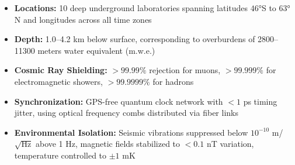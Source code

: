 \documentclass[11pt,a4paper,twoside]{article}
\begin{document}
\begin{itemize}[leftmargin=*]
    \item \textbf{Locations:} 10 deep underground laboratories spanning latitudes $46°$S to $63°$N and longitudes across all time zones
    \item \textbf{Depth:} 1.0--4.2 km below surface, corresponding to overburdens of 2800--11300 meters water equivalent (m.w.e.)
    \item \textbf{Cosmic Ray Shielding:} $>99.99\%$ rejection for muons, $>99.999\%$ for electromagnetic showers, $>99.9999\%$ for hadrons
    \item \textbf{Synchronization:} GPS-free quantum clock network with $<1$ ps timing jitter, using optical frequency combs distributed via fiber links
    \item \textbf{Environmental Isolation:} Seismic vibrations suppressed below $10^{-10}$ m/$\sqrt{\text{Hz}}$ above 1 Hz, magnetic fields stabilized to $<0.1$ nT variation, temperature controlled to $\pm 1$ mK
\end{itemize}
\end{document}
